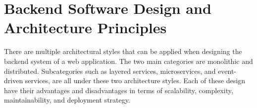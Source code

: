 \chapter{Backend Software Design and Architecture Principles}\label{chap:architecture}
There are multiple architectural styles that can be applied when designing the backend system of a web application.
The two main categories are monolithic and distributed. Subcategories such as layered services, microservices, and event-driven services, are all under
these two architecture styles. Each of these design have their advantages and disadvantages in terms of scalability, complexity, maintainability, and deployment strategy.




